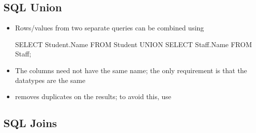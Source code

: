 \documentclass[a4paper]{article}
\begin{document}
\subsection{SQL Union}
\begin{itemize}
    \item Rows/values from two separate queries can be combined using 
\begin{sql}
SELECT Student.Name FROM Student
UNION
SELECT Staff.Name FROM Staff;
\end{sql}
    \item The columns need not have the same name; the only requirement is that the datatypes are the same
    \item {} removes duplicates on the results; to avoid this, use 
\end{itemize}

\subsection{SQL Joins}
\end{document}
